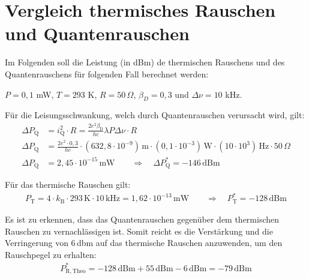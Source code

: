 
\section{Vergleich thermisches Rauschen und Quantenrauschen}
\label{sec:rauschen}

Im Folgenden soll die Leistung (in dBm) de thermischen Rauschens und des Quantenrauschens für folgenden Fall berechnet werden:

$P = 0,1$ mW, $T = 293$ K, $R = 50\, \Omega$, $\beta_D = 0,3$ und $\Delta \nu = 10$ kHz.

Für die Leisungsschwankung, welch durch Quantenrauschen verursacht wird, gilt:
\begin{align}
    \Delta P_\mathrm{Q} &= i^2_\mathrm{Q} \cdot R = \frac{2e^2\beta_\mathrm{D}}{hc}\lambda P \Delta \nu \cdot R \\
    \Delta P_\mathrm{Q} &= \frac{2e^2 \cdot 0,3}{hc} \cdot (632,8 \cdot 10^{-9}) \, \mathrm{m} \cdot (0,1 \cdot 10^{-3})\, \mathrm{W} \cdot (10 \cdot 10^3) \, \mathrm{Hz} \cdot 50 \, \Omega \\
    \Delta P_\mathrm{Q} &= 2,45 \cdot 10^{-15}\,\mathrm{mW} \qquad \Rightarrow \quad \Delta P_\mathrm{Q}^* = -146 \, \mathrm{dBm}
\end{align}

Für das thermische Rauschen gilt:
\begin{gather}
    P_\mathrm{T} = 4 \cdot k_\mathrm{B} \cdot 293\,\text{K} \cdot 10\,\text{kHz} = 1,62 \cdot 10^{-13}\, \text{mW} \qquad \Rightarrow \quad P_\mathrm{T}^* = -128 \, \text{dBm}
\end{gather}

Es ist zu erkennen, dass das Quantenrauschen gegenüber dem thermischen Rauschen zu vernachlässigen ist.
Somit reicht es die Verstärkung und die Verringerung von 6\,dbm \cite{anleitung} auf das thermische Rauschen anzuwenden, um den Rauschpegel zu erhalten:
\begin{gather}
    P_\mathrm{R,Theo}^* = -128 \, \text{dBm} + 55\, \text{dBm} - 6 \, \text{dBm}= -79 \, \text{dBm}
\end{gather}